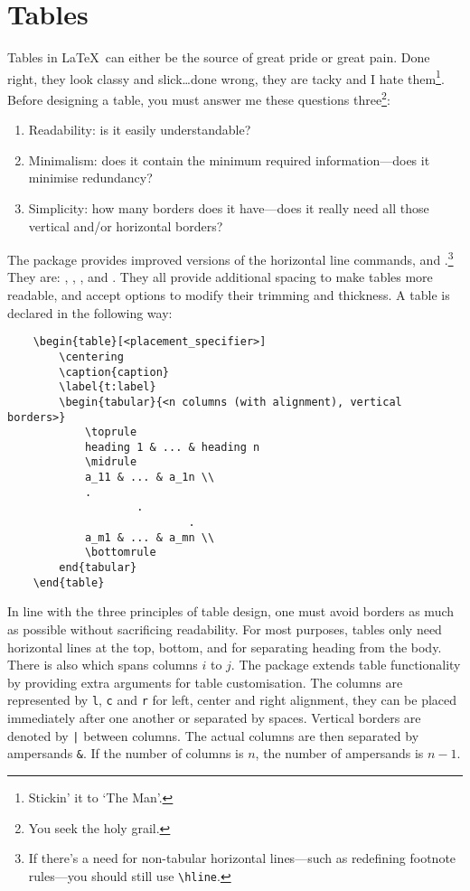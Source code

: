 \section{Tables}
%
Tables in \LaTeX~can either be the source of great pride or great
pain.  Done right, they look classy and slick\ldots done wrong, they
are tacky and I hate them\footnote{Stickin' it to `The Man'.}.  Before
designing a table, you must answer me these questions
three\footnote{You seek the holy grail.}:
\begin{enumerate}
\item Readability: is it easily understandable?
\item Minimalism: does it contain the minimum required
  information---does it minimise redundancy?
\item Simplicity: how many borders does it have---does it really need
  all those vertical and/or horizontal borders?
\end{enumerate}
The package  provides improved versions of the
horizontal line commands,  and
.\footnote{If there's a need for non-tabular horizontal
  lines---such as redefining footnote rules---you should still use
  \texttt{\textbackslash hline}.}  They are: ,
, , and .  They all
provide additional spacing to make tables more readable, and accept
options to modify their trimming and thickness.  A table is declared
in the following way:
\begin{verbatim}
	\begin{table}[<placement_specifier>]
	    \centering
	    \caption{caption}
	    \label{t:label}
	    \begin{tabular}{<n columns (with alignment), vertical borders>}
	        \toprule
	        heading 1 & ... & heading n
	        \midrule
	        a_11 & ... & a_1n \\
	        .
	                .
	                        .
	        a_m1 & ... & a_mn \\
	        \bottomrule
	    end{tabular}
	\end{table}
\end{verbatim}

In line with the three principles of table design, one must avoid
borders as much as possible without sacrificing readability.  For most
purposes, tables only need horizontal lines at the top, bottom, and
for separating heading from the body.  There is also
 which spans columns $i$ to $j$.  The
 package extends table functionality by providing extra
arguments for table customisation.  The columns are represented by
\verb|l|, \verb|c| and \verb|r| for left, center and right alignment,
they can be placed immediately after one another or separated by
spaces.  Vertical borders are denoted by \verb+|+ between columns.
The actual columns are then separated by ampersands \verb|&|.  If the
number of columns is $n$, the number of ampersands is $n-1$.


